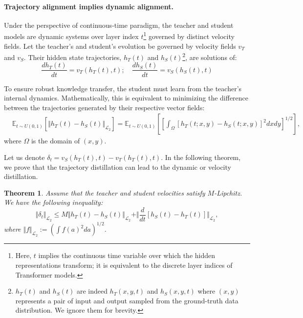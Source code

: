 \documentclass{article} %
\newtheorem{theorem}{Theorem}[section]
\theoremstyle{definition}
\theoremstyle{remark}
\begin{document}
\paragraph{Trajectory alignment implies dynamic alignment.} Under the perspective of continuous-time paradigm, the teacher and student models are dynamic systems over layer index $t$\footnote{Here, $t$ implies the continuous time variable over which the hidden representations transform; it is equivalent to the discrete layer indices of Transformer models.} governed by distinct velocity fields. Let the teacher's and student's evolution be governed by velocity fields $v_T$ and $v_S$. Their hidden state trajectories, $h_T(t)$ and $h_S(t)$\footnote{$h_T(t)$ and $h_S(t)$ are indeed $h_T(x,y, t)$ and $h_S(x,y, t)$ where $(x,y)$ represents a pair of input and output sampled from the ground-truth data distribution. We ignore them for brevity.}, are solutions of:
\begin{equation}
\frac{dh_{T}(t)}{dt}=v_{T}(h_{T}(t),t); \quad \frac{dh_{S}(t)}{dt}=v_{S}(h_{S}(t),t)
\end{equation}

To ensure robust knowledge transfer, the student must learn from the teacher's internal dynamics. Mathematically, this is equivalent to minimizing the difference between the trajectories generated by their respective vector fields:
\begin{align}
 & \mathbb{E}_{t\sim U\left(0,1\right)}\left[\Vert h_{T}\left(t\right)-h_{S}\left(t\right)\Vert_{\mathcal{L}_{2}}\right]
 =\mathbb{E}_{t\sim U\left(0,1\right)}\left[\left[\int_{\Omega}\left[h_{T}\left(t;x,y\right)-h_{S}\left(t;x,y\right)\right]^{2}dxdy\right]^{1/2}\right],
\end{align}
where $\Omega$ is the domain of $(x,y)$. 

Let us denote $\delta_{t}=v_{S}\left(h_{T}\left(t\right),t\right)-v_{T}\left(h_{T}\left(t\right),t\right)$. In the following theorem, we prove that the trajectory distillation can lead to the dynamic or velocity distillation. 

\begin{theorem}
  \label{def:inj}
Assume that the teacher and student velocities satisfy $M$-Lipchitz. We have the following inequality:
\begin{equation}
\label{eq:delta_bound}
\Vert\delta_{t}\Vert_{\mathcal{L}_{2}} \leq M\Vert h_{T}\left(t\right)-h_{S}\left(t\right)\Vert_{\mathcal{L}_{2}}
 +\Vert\frac{d}{dt}\left[h_{S}\left(t\right)-h_{T}\left(t\right)\right]\Vert_{\mathcal{L}_{2}},
\end{equation}
where $\Vert f\Vert_{\mathcal{L}_{2}}:=\left(\int f\left(a\right)^{2}da\right)^{1/2}$.
\end{theorem}
\end{document}
